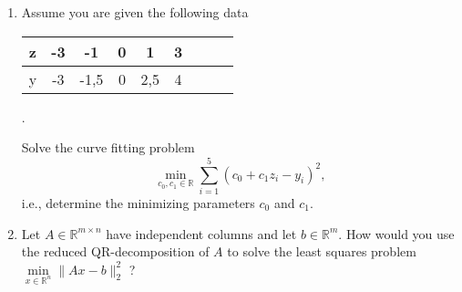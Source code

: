 \vspace*{-0.5cm}
\begin{enumerate}
	\item Assume you are given the following data
	\begin{center}
	\begin{tabular}{|l|c|c|c|c|c|c||c|c|}\hline
		z&-3&-1&0&1&3\\ 
		\hline
		y&-3&-1,5&0&2,5&4\\
		\hline
	\end{tabular}.
\end{center}
	Solve the curve fitting problem
	$$
	\min\limits_{c_0, c_1 \in \mathbb{R}} \sum_{i=1}^5 (c_0 + c_1z_i - y_i)^2,
	$$
	i.e., determine the minimizing parameters $c_0$ and $c_1$.
	\item Let  $A \in \mathbb{R}^{m \times n}$ have independent columns and let $b \in \mathbb{R}^{m}$. How would you use the reduced QR-decomposition of $A$ to solve the least squares problem $
\min\limits_{x \in \mathbb{R}^n } \| Ax - b \|_2^2
$ ?
\end{enumerate}

 